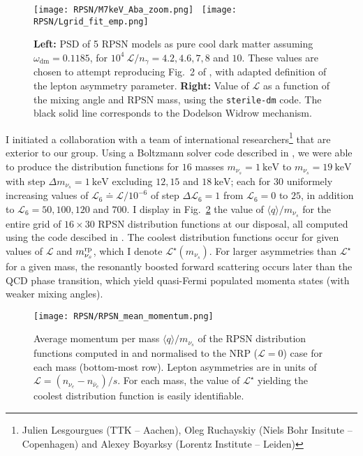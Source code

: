 \begin{figure}
\begin{center}
\texttt{[image: RPSN/M7keV\_Aba\_zoom.png]}~%
\texttt{[image: RPSN/Lgrid\_fit\_emp.png]}
\caption{\textbf{Left:} PSD of 5 RPSN models as pure cool dark matter assuming $\omega_\mathrm{dm} = 0.1185$, for $10^4~\mathcal{L} / n_\gamma = 4.2, 4.6, 7, 8$ and $10$. These values are chosen to attempt reproducing Fig.~2 of \cite{Abazajian2014}, with adapted definition of the lepton asymmetry parameter. \textbf{Right:} Value of $\mathcal{L}$ as a function of the mixing angle and RPSN mass, using the \texttt{sterile-dm} code. The black solid line corresponds to the Dodelson Widrow mechanism.}
\label{fig:rpsn_steriledm_7keV}
\end{center}
\end{figure}

I initiated a collaboration with a team of international researchers\footnote{Julien Lesgourgues (TTK -- Aachen), Oleg Ruchayskiy (Niels Bohr Insitute -- Copenhagen) and Alexey Boyarksy (Lorentz Institute -- Leiden)} that are exterior to our group. Using a Boltzmann solver code described in \cite{LaineMSM, Ghiglieri2015jua}, we were able to produce the distribution functions for $16$ masses $m_{\nu_s} = 1~\mathrm{keV}$ to $m_{\nu_s} = 19~\mathrm{keV}$ with step $\Delta m_{\nu_s} = 1~\mathrm{keV}$ excluding $12, 15$ and $18~\mathrm{keV}$; each for $30$ uniformely increasing values of $\mathcal{L}_6 \doteq \mathcal{L} / 10^{-6}$ of step $\Delta \mathcal{L}_6 = 1$ from $\mathcal{L}_6 = 0$ to $25$, in addition to $\mathcal{L}_6 = 50, 100, 120$ and $700$. I display in Fig.~\ref{fig:rpsn_banana} the value of $\langle q
\rangle / m_{\nu_s}$ for the entire grid of $16 \times 30$ RPSN distribution functions at our disposal, all computed using the code descibed in \cite{LaineMSM, Ghiglieri2015jua}. The coolest distribution functions occur for given values of $\mathcal{L}$ and $m_{\nu_s}^{\rm{rp}}$, which I denote $\mathcal{L}^{\star} (m_{\nu_s})$. For larger asymmetries than $\mathcal{L}^{\star}$ for a given mass, the resonantly boosted forward scattering occurs later than the QCD phase transition, which yield quasi-Fermi populated momenta states (with weaker mixing angles). \\

\begin{figure}
\begin{center}
\texttt{[image: RPSN/RPSN\_mean\_momentum.png]}
\caption{Average momentum per mass
  $\langle q \rangle / m_{\nu_s}$ of the RPSN distribution functions computed in \cite{LaineMSM} and normalised to the NRP ($\mathcal{L}=0$) case for each mass (bottom-most row). Lepton asymmetries are in units of
  $\mathcal L = \left( n_{\nu_e} - n_{\bar{\nu}_{e}} \right) / s$. For each
  mass, the value of $\mathcal{L}^{\star}$ yielding the coolest distribution
  function is easily identifiable.}
\label{fig:rpsn_banana}
\end{center}
\end{figure}

